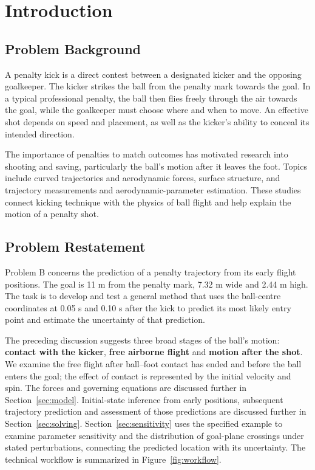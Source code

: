 \documentclass[12pt,letterpaper]{article}
\begin{document}
\section{Introduction}
\subsection{Problem Background}
A penalty kick is a direct contest between a designated kicker and the opposing goalkeeper. The kicker strikes the ball from the penalty mark towards the goal. In a typical professional penalty, the ball then flies freely through the air towards the goal, while the goalkeeper must choose where and when to move. An effective shot depends on speed and placement, as well as the kicker's ability to conceal its intended direction.

The importance of penalties to match outcomes has motivated research into shooting and saving, particularly the ball's motion after it leaves the foot. Topics include curved trajectories and aerodynamic forces\cite{maponi}, surface structure\cite{asai2007,paudel}, and trajectory measurements and aerodynamic-parameter estimation\cite{goff2009}. These studies connect kicking technique with the physics of ball flight and help explain the motion of a penalty shot.

\subsection{Problem Restatement}
Problem B concerns the prediction of a penalty trajectory from its early flight positions. The goal is 11 m from the penalty mark, 7.32 m wide and 2.44 m high. The task is to develop and test a general method that uses the ball-centre coordinates at 0.05 s and 0.10 s after the kick to predict its most likely entry point and estimate the uncertainty of that prediction.

The preceding discussion suggests three broad stages of the ball's motion: \textbf{contact with the kicker}, \textbf{free airborne flight} and \textbf{motion after the shot}. We examine the free flight after ball--foot contact has ended and before the ball enters the goal; the effect of contact is represented by the initial velocity and spin. The forces and governing equations are discussed further in Section~\ref{sec:model}. Initial-state inference from early positions, subsequent trajectory prediction and assessment of those predictions are discussed further in Section~\ref{sec:solving}. Section~\ref{sec:sensitivity} uses the specified example to examine parameter sensitivity and the distribution of goal-plane crossings under stated perturbations, connecting the predicted location with its uncertainty. The technical workflow is summarized in Figure~\ref{fig:workflow}.
\end{document}
